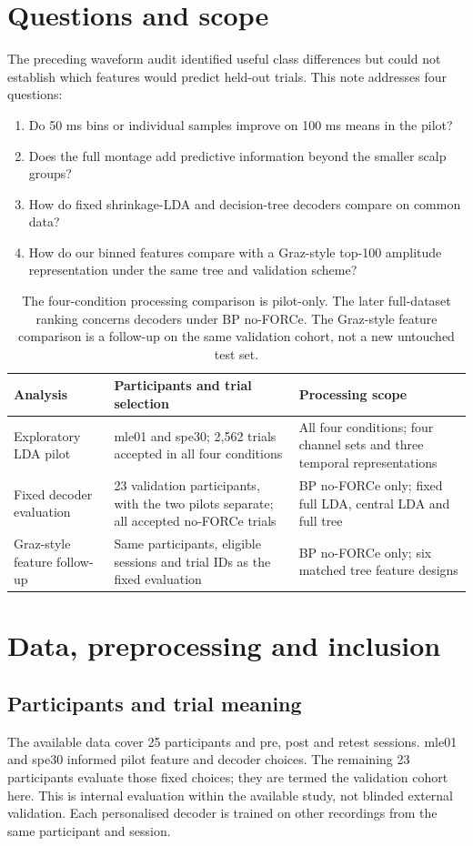 \documentclass[11pt,a4paper]{article}
\begin{document}
\section{Questions and scope}
The preceding waveform audit identified useful class differences but could not establish which features would predict held-out trials. This note addresses four questions:
\begin{enumerate}
\setlength{\itemsep}{1pt}
\item Do 50 ms bins or individual samples improve on 100 ms means in the pilot?
\item Does the full montage add predictive information beyond the smaller scalp groups?
\item How do fixed shrinkage-LDA and decision-tree decoders compare on common data?
\item How do our binned features compare with a Graz-style top-100 amplitude representation under the same tree and validation scheme?
\end{enumerate}
\begin{table}[H]\centering\small
\begin{tabularx}{\linewidth}{@{}lXX@{}}\toprule
Analysis & Participants and trial selection & Processing scope\\\midrule
Exploratory LDA pilot & mle01 and spe30; 2,562 trials accepted in all four conditions & All four conditions; four channel sets and three temporal representations\\
Fixed decoder evaluation & 23 validation participants, with the two pilots separate; all accepted no-FORCe trials & BP no-FORCe only; fixed full LDA, central LDA and full tree\\
Graz-style feature follow-up & Same participants, eligible sessions and trial IDs as the fixed evaluation & BP no-FORCe only; six matched tree feature designs\\\bottomrule
\end{tabularx}
\caption{The four-condition processing comparison is pilot-only. The later full-dataset ranking concerns decoders under BP no-FORCe. The Graz-style feature comparison is a follow-up on the same validation cohort, not a new untouched test set.}\label{tab:scope}
\end{table}

\clearpage
\section{Data, preprocessing and inclusion}
\subsection{Participants and trial meaning}
The available data cover 25 participants and pre, post and retest sessions. mle01 and spe30 informed pilot feature and decoder choices. The remaining 23 participants evaluate those fixed choices; they are termed the validation cohort here. This is internal evaluation within the available study, not blinded external validation. Each personalised decoder is trained on other recordings from the same participant and session.
\end{document}
